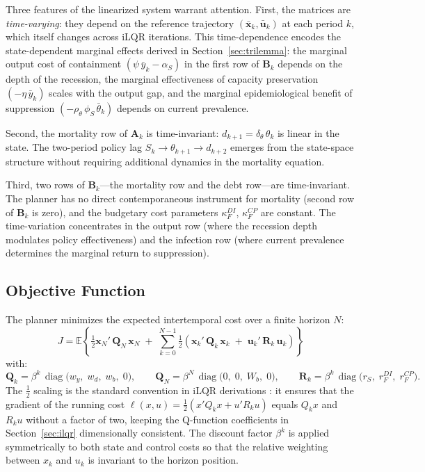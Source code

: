 Three features of the linearized system warrant attention. First, the matrices are
\textit{time-varying}: they depend on the reference trajectory
$(\bar{\bm{x}}_k, \bar{\bm{u}}_k)$ at each period $k$, which itself changes across
iLQR iterations. This time-dependence encodes the state-dependent marginal effects
derived in Section~\ref{sec:trilemma}: the marginal output cost of containment
$(\psi\,\bar{y}_k - \alpha_S)$ in the first row of $\bm{B}_k$ depends on the depth of
the recession, the marginal effectiveness of capacity preservation $(-\eta\,\bar{y}_k)$
scales with the output gap, and the marginal epidemiological benefit of suppression
$(-\rho_\theta\,\phi_S\,\bar{\theta}_k)$ depends on current prevalence.

Second, the mortality row of $\bm{A}_k$ is time-invariant: $d_{k+1} = \delta_\theta\,
\theta_k$ is linear in the state. The two-period policy lag
$S_k \to \theta_{k+1} \to d_{k+2}$ emerges from the state-space structure without
requiring additional dynamics in the mortality equation.

Third, two rows of $\bm{B}_k$---the mortality row and the debt row---are
time-invariant. The planner has no direct contemporaneous instrument for mortality
(second row of $\bm{B}_k$ is zero), and the budgetary cost parameters
$\kappa_F^{DI}$, $\kappa_F^{CP}$ are constant. The time-variation concentrates in the
output row (where the recession depth modulates policy effectiveness) and the infection
row (where current prevalence determines the marginal return to suppression).


\subsection{Objective Function}
\label{sec:objective}

The planner minimizes the expected intertemporal cost over a finite horizon $N$:
%
\begin{equation}
    J = \mathbb{E}\left\{\tfrac{1}{2}\bm{x}_N'\,\bm{Q}_N\,\bm{x}_N
    \;+\; \sum_{k=0}^{N-1}\tfrac{1}{2}\left(\bm{x}_k'\,\bm{Q}_k\,\bm{x}_k
    \;+\; \bm{u}_k'\,\bm{R}_k\,\bm{u}_k\right)\right\}
    \label{eq:objective}
\end{equation}
%
with:
%
\begin{equation}
    \bm{Q}_k = \beta^k\,\operatorname{diag}\bigl(w_y,\; w_d,\; w_b,\; 0\bigr),
    \qquad
    \bm{Q}_N = \beta^N\,\operatorname{diag}\bigl(0,\; 0,\; W_b,\; 0\bigr),
    \qquad
    \bm{R}_k = \beta^k\,\operatorname{diag}\bigl(r_S,\; r_F^{DI},\; r_F^{CP}\bigr).
    \label{eq:weights}
\end{equation}
%
The $\tfrac{1}{2}$ scaling is the standard convention in iLQR derivations
\citep{li2004iterative, tassa2014control}: it ensures that the gradient of the
running cost $\ell(x,u) = \tfrac{1}{2}(x'Q_k x + u'R_k u)$ equals $Q_k x$ and
$R_k u$ without a factor of two, keeping the Q-function coefficients in
Section~\ref{sec:ilqr} dimensionally consistent. The discount factor $\beta^k$ is
applied symmetrically to both state and control costs so that the relative weighting
between $x_k$ and $u_k$ is invariant to the horizon position.

